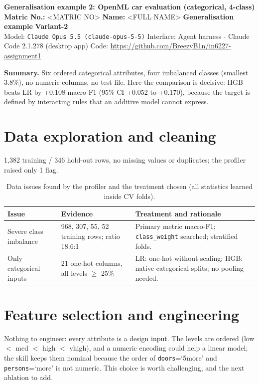 \documentclass[10pt]{article}
\begin{document}
\begin{center}
{\large\bfseries Generalisation example 2: OpenML car evaluation (categorical, 4-class)}\\[2pt]
\textbf{Matric No.:} <MATRIC NO> \quad \textbf{Name:} <FULL NAME> \quad \textbf{Generalisation example} \quad \textbf{Variant-2}\\[1pt]
{\footnotesize Model: \texttt{Claude Opus 5.5 (claude-opus-5-5)} \textbar{} Interface: Agent harness - Claude Code 2.1.278 (desktop app) \textbar{} Code: \url{https://github.com/BreezyB1n/in6227-assignment1}}
\end{center}
\vspace{-4pt}
{\small \textbf{Summary.} Six ordered categorical attributes, four imbalanced classes (smallest 3.8\%), no numeric columns, no test file. Here the comparison is decisive: HGB beats LR by +0.108 macro-F1 (95\% CI +0.052 to +0.170), because the target is defined by interacting rules that an additive model cannot express.}

\section{Data exploration and cleaning}
1{,}382 training / 346 hold-out rows, no missing values or duplicates; the profiler raised only 1 flag. \begin{table}[!htb]\centering\footnotesize\setlength{\tabcolsep}{3pt}
\caption{Data issues found by the profiler and the treatment chosen (all statistics learned inside CV folds).}\label{tab:issues}
\begin{tabularx}{\linewidth}{>{\raggedright\arraybackslash}p{2.6cm} Y Y}\toprule
Issue & Evidence & Treatment and rationale\\\midrule
Severe class imbalance & {968, 307, 55, 52} training rows; ratio 18.6:1 & Primary metric macro-F1; \texttt{class\_weight} searched; stratified folds.\\
Only categorical inputs & 21 one-hot columns, all levels $\ge$ 25\% & LR: one-hot without scaling; HGB: native categorical splits; no pooling needed.\\
\bottomrule\end{tabularx}\end{table}


\section{Feature selection and engineering}
Nothing to engineer: every attribute is a design input. The levels are ordered (low $<$ med $<$ high $<$ vhigh), and a numeric encoding could help a linear model; the skill keeps them nominal because the order of \texttt{doors}=`5more' and \texttt{persons}=`more' is not numeric. This choice is worth challenging, and the next ablation to add.
\end{document}
